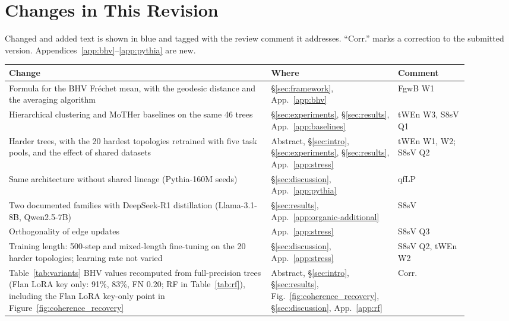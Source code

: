 \documentclass{article}
\theoremstyle{definition}
\theoremstyle{plain}
\newif\ifrevision
\newcommand{\rev}[1]{\ifrevision{\color{blue}#1}\else#1\fi}
\newcommand{\revcolor}{\ifrevision\color{blue}\fi}
\begin{document}




\appendix

\ifrevision
\section*{\rev{Changes in This Revision}}
{\revcolor
Changed and added text is shown in blue and tagged with the review comment it addresses. ``Corr.'' marks a correction to the submitted version. Appendices~\ref{app:bhv}--\ref{app:pythia} are new.

\begin{center}
\small
\begin{tabular}{p{0.52\linewidth}p{0.24\linewidth}p{0.14\linewidth}}
\toprule
Change & Where & Comment \\
\midrule
Formula for the BHV Fr\'echet mean, with the geodesic distance and the averaging algorithm & \S\ref{sec:framework}, App.~\ref{app:bhv} & FgwB W1 \\
Hierarchical clustering and MoTHer baselines on the same 46 trees & \S\ref{sec:experiments}, \S\ref{sec:results}, App.~\ref{app:baselines} & tWEn W3, S8sV Q1 \\
Harder trees, with the 20 hardest topologies retrained with five task pools, and the effect of shared datasets & Abstract, \S\ref{sec:intro}, \S\ref{sec:experiments}, \S\ref{sec:results}, App.~\ref{app:stress} & tWEn W1, W2; S8sV Q2 \\
Same architecture without shared lineage (Pythia-160M seeds) & \S\ref{sec:discussion}, App.~\ref{app:pythia} & qfLP \\
Two documented families with DeepSeek-R1 distillation (Llama-3.1-8B, Qwen2.5-7B) & \S\ref{sec:results}, App.~\ref{app:organic-additional} & S8sV \\
Orthogonality of edge updates & App.~\ref{app:stress} & S8sV Q3 \\
Training length: 500-step and mixed-length fine-tuning on the 20 harder topologies; learning rate not varied & \S\ref{sec:discussion}, App.~\ref{app:stress} & S8sV Q2, tWEn W2 \\
Table~\ref{tab:variants} BHV values recomputed from full-precision trees (Flan LoRA key only: 91\%, 83\%, FN 0.20; RF in Table~\ref{tab:rf}), including the Flan LoRA key-only point in Figure~\ref{fig:coherence_recovery} & Abstract, \S\ref{sec:intro}, \S\ref{sec:results}, Fig.~\ref{fig:coherence_recovery}, \S\ref{sec:discussion}, App.~\ref{app:rf} & Corr. \\

\end{tabular}
\end{center}}
\end{document}
